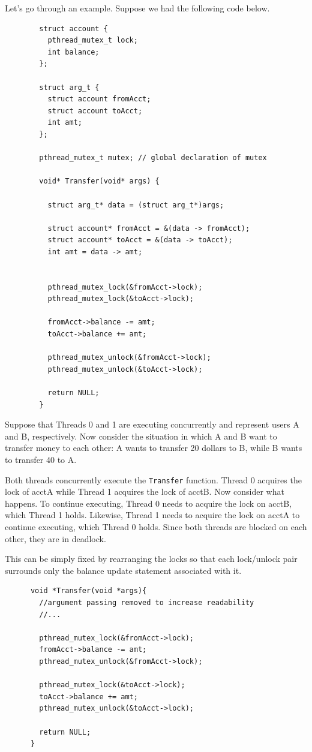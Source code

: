 \documentclass{article}
\begin{document}
    \begin{example}
      Let's go through an example. Suppose we had the following code below. 
      \begin{lstlisting}
        struct account {
          pthread_mutex_t lock; 
          int balance; 
        }; 

        struct arg_t {
          struct account fromAcct; 
          struct account toAcct; 
          int amt; 
        }; 

        pthread_mutex_t mutex; // global declaration of mutex

        void* Transfer(void* args) {

          struct arg_t* data = (struct arg_t*)args; 

          struct account* fromAcct = &(data -> fromAcct); 
          struct account* toAcct = &(data -> toAcct); 
          int amt = data -> amt; 


          pthread_mutex_lock(&fromAcct->lock);
          pthread_mutex_lock(&toAcct->lock);

          fromAcct->balance -= amt;
          toAcct->balance += amt;

          pthread_mutex_unlock(&fromAcct->lock);
          pthread_mutex_unlock(&toAcct->lock);

          return NULL; 
        }
      \end{lstlisting}
      Suppose that Threads 0 and 1 are executing concurrently and represent users A and B, respectively. Now consider the situation in which A and B want to transfer money to each other: A wants to transfer 20 dollars to B, while B wants to transfer 40 to A.

      Both threads concurrently execute the \texttt{Transfer} function. Thread 0 acquires the lock of acctA while Thread 1 acquires the lock of acctB. Now consider what happens. To continue executing, Thread 0 needs to acquire the lock on acctB, which Thread 1 holds. Likewise, Thread 1 needs to acquire the lock on acctA to continue executing, which Thread 0 holds. Since both threads are blocked on each other, they are in deadlock.

      This can be simply fixed by rearranging the locks so that each lock/unlock pair surrounds only the balance update statement associated with it. 
      \begin{lstlisting}
      void *Transfer(void *args){
        //argument passing removed to increase readability
        //...

        pthread_mutex_lock(&fromAcct->lock);
        fromAcct->balance -= amt;
        pthread_mutex_unlock(&fromAcct->lock);

        pthread_mutex_lock(&toAcct->lock);
        toAcct->balance += amt;
        pthread_mutex_unlock(&toAcct->lock);

        return NULL;
      } 
      \end{lstlisting}
    \end{example}
\end{document}
